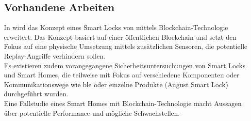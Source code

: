     \subsection{Vorhandene Arbeiten}
    \label{sec:problem_relatedWork}
        In \cite{Han2017} wird das Konzept eines Smart Locks von \cite{Park2009} mittels Blockchain-Technologie erweitert.
        Das Konzept basiert auf einer öffentlichen Blockchain und setzt den Fokus auf eine physische Umsetzung mittels zusätzlichen Sensoren, die potentielle Replay-Angriffe verhindern sollen.
        \medskip\\
        Es existieren zudem vorangegangene Sicherheitsuntersuchungen von Smart Locks \cite{Ho2016,Ye2017} und Smart Homes\cite{Fernandes2016}, die teilweise mit Fokus auf verschiedene Komponenten oder Kommunikationswege wie \gls{ble}\cite{Rose2016} oder einzelne Produkte (August Smart Lock\cite{Fuller2017}) durchgeführt wurden.
        \medskip\\
        Eine Fallstudie eines Smart Homes mit Blockchain-Technologie\cite{Dorri2017} macht Aussagen über potentielle Performance und mögliche Schwachstellen.
